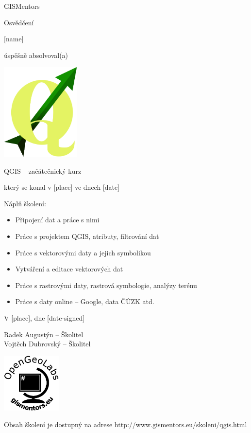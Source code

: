 \documentclass[12pt, a4paper]{letter}
\begin{document}
\pagestyle{empty}
\begin{center}

{\Large GISMentors}

{\Huge Osvědčení}

{\Large [name]}

úspěšně absolvoval(a)

\includegraphics[width=0.30\textwidth]{../images/qgislogo_vector.eps}

{\Large QGIS -- začátečnický kurz}

který se konal v [place] ve dnech [date]
\end{center}

Náplň školení:

\begin{itemize}
    \item Připojení dat a práce s nimi
    \item Práce s projektem QGIS, atributy, filtrování dat
    \item Práce s vektorovými daty a jejich symbolikou
    \item Vytváření a editace vektorových dat
    \item Práce s rastrovými daty, rastrová symbologie, analýzy terénu
    \item Práce s daty online -- Google, data ČÚZK atd.
\end{itemize}

\vfill
\parbox{7cm}{

    V [place], dne [date-signed]\\

\vfill

    Radek Augustýn -- Školitel\\

\vfill
    Vojtěch Dubrovský -- Školitel
}
\hfill
\parbox{3cm}{
    \includegraphics[width=3cm]{../images/placka.eps}
}


\begin{center}
{\footnotesize Obsah školení je dostupný na adrese
http://www.gismentors.eu/skoleni/qgis.html}
\end{center}
\end{document}
